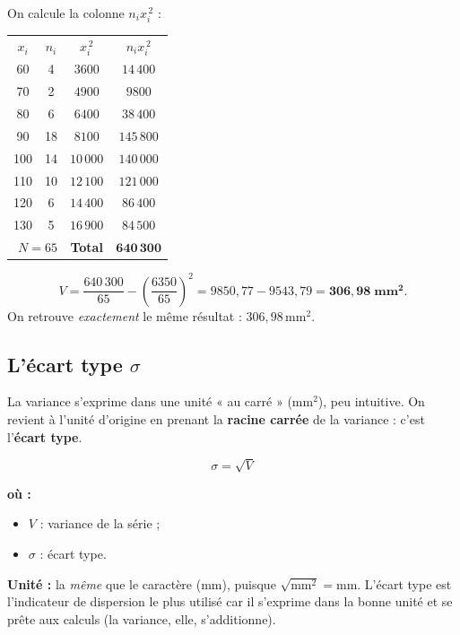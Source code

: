 \documentclass[11pt,a4paper]{article}
\newenvironment{ou}{%
  \par\smallskip\noindent\textbf{où :}\nopagebreak
  \begin{itemize}[leftmargin=1.8em,topsep=2pt,itemsep=1.5pt,parsep=0pt]}%
  {\end{itemize}}
\newcommand{\ect}{\sigma}                %
\begin{document}
\begin{exemple}
On calcule la colonne $n_i x_i^{\,2}$ :
\begin{center}
\renewcommand{\arraystretch}{1.15}
\begin{tabular}{c c c c}
\rowcolor{primary!18}
$x_i$ & $n_i$ & $x_i^{\,2}$ & $n_i x_i^{\,2}$ \\
60  & 4  & $3600$  & $14\,400$ \\
70  & 2  & $4900$  & $9800$ \\
80  & 6  & $6400$  & $38\,400$ \\
90  & 18 & $8100$  & $145\,800$ \\
100 & 14 & $10\,000$ & $140\,000$ \\
110 & 10 & $12\,100$ & $121\,000$ \\
120 & 6  & $14\,400$ & $86\,400$ \\
130 & 5  & $16\,900$ & $84\,500$ \\
\hline
\multicolumn{2}{r}{$N=65$} & \textbf{Total} & $\mathbf{640\,300}$ \\
\end{tabular}
\end{center}
\[
V=\dfrac{640\,300}{65}-\left(\dfrac{6350}{65}\right)^{2}
  =9850{,}77-9543{,}79=\mathbf{306{,}98\;\text{mm}^2}.
\]
On retrouve \emph{exactement} le même résultat : $306{,}98$\,mm$^2$.
\end{exemple}

\subsection{L'écart type $\ect$}

La variance s'exprime dans une unité « au carré » (mm$^2$), peu intuitive. On revient à l'unité
d'origine en prenant la \textbf{racine carrée} de la variance : c'est l'\textbf{écart type}.

\begin{formule}[écart type $\ect$]
\[
\boxed{\;\ect=\sqrt{V}\;}
\]
\begin{ou}
  \item $V$ : variance de la série ;
  \item $\ect$ : écart type.
\end{ou}
\textbf{Unité :} la \emph{même} que le caractère (mm), puisque $\sqrt{\text{mm}^2}=\text{mm}$.
L'écart type est l'indicateur de dispersion le plus utilisé car il s'exprime dans la bonne unité et
se prête aux calculs (la variance, elle, s'additionne).
\end{formule}
\end{document}
